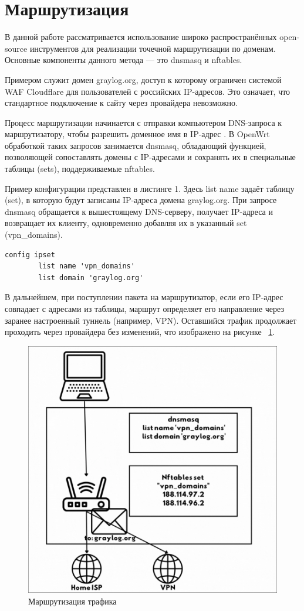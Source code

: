 
\section{Маршрутизация}

В данной работе рассматривается использование широко распространённых open-source инструментов для реализации точечной маршрутизации по доменам. Основные компоненты данного метода — это dnsmasq и nftables.

Примером служит домен graylog.org, доступ к которому ограничен системой WAF Cloudflare для пользователей с российских IP-адресов. Это означает, что стандартное подключение к сайту через провайдера невозможно.

Процесс маршрутизации начинается с отправки компьютером DNS-запроса к маршрутизатору, чтобы разрешить доменное имя в IP-адрес \cite{tanenbaum}. В OpenWrt обработкой таких запросов занимается dnsmasq, обладающий функцией, позволяющей сопоставлять домены с IP-адресами и сохранять их в специальные таблицы (sets), поддерживаемые nftables.

Пример конфигурации представлен в листинге 1. Здесь list name задаёт таблицу (set), в которую будут записаны IP-адреса домена graylog.org. При запросе dnsmasq обращается к вышестоящему DNS-серверу, получает IP-адреса и возвращает их клиенту, одновременно добавляя их в указанный set (vpn\_domains).

\begin{lstlisting}[frame=rlbt,caption={Пример конфигурации Dnsmasq}]
config ipset
        list name 'vpn_domains'
        list domain 'graylog.org'
\end{lstlisting}

В дальнейшем, при поступлении пакета на маршрутизатор, если его IP-адрес совпадает с адресами из таблицы, маршрут определяет его направление через заранее настроенный туннель (например, VPN). Оставшийся трафик продолжает проходить через провайдера без изменений, что изображено на рисунке ~\ref{fig:fig01}.


\begin{figure}
  \centering
  \includegraphics[scale=0.5]{inc/routing.png}
  \caption{Маршрутизация трафика}
  \label{fig:fig01}
\end{figure}
